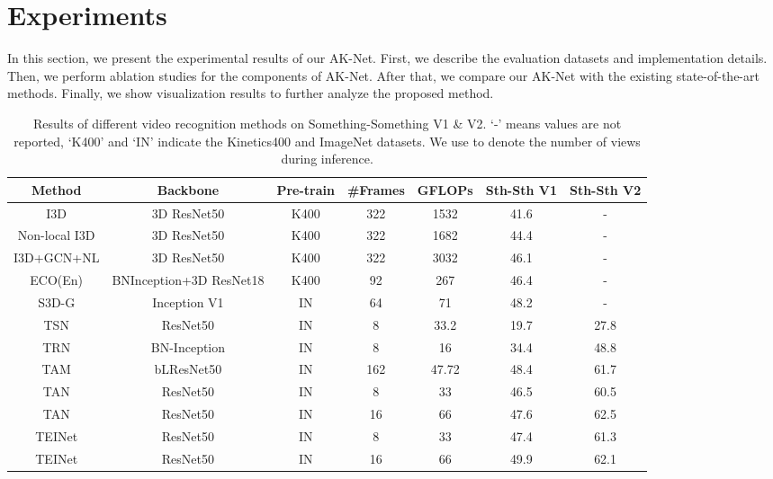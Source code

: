 \documentclass[journal]{IEEEtran}
\begin{document}
\section{Experiments} \label{sec:experiment}
In this section, we present the experimental results of our AK-Net.
First, we describe the evaluation datasets and implementation details.
Then, we perform ablation studies for the components of AK-Net.
After that, we compare our AK-Net with the existing state-of-the-art methods.
Finally, we show visualization results to further analyze the proposed method.

\begin{table*}[ht]
	\centering
	\caption{Results of different video recognition methods on Something-Something V1 \& V2. 
	`-' means values are not reported, `K400' and `IN' indicate the Kinetics400 and ImageNet datasets.
	We use  to denote the number of views during inference.}
	\label{tab:sth-sth}
	\begin{tabular}{c|c|c|c|c|c|c} \hline
		\textbf{Method} & \textbf{Backbone} & \textbf{Pre-train} & \textbf{\#Frames} & \textbf{GFLOPs} & \textbf{Sth-Sth V1} & \textbf{Sth-Sth V2} \\ \hline
		I3D \cite{carreira2017quo} & 3D ResNet50 & K400 & 322 & 1532 & 41.6 & - \\
		Non-local I3D \cite{wang2018videos} & 3D ResNet50 & K400 & 322 & 1682 & 44.4 & -\\
		I3D+GCN+NL \cite{wang2018videos} & 3D ResNet50 & K400 & 322 & 3032 & 46.1 & - \\
		ECO(En) \cite{zolfaghari2018eco} & BNInception+3D ResNet18 & K400 & 92 & 267 & 46.4 & - \\ 
		S3D-G \cite{xie2018rethinking} & Inception V1 & IN & 64 & 71 & 48.2 & - \\ \hline
		TSN \cite{wang2016temporal} & ResNet50 & IN & 8 & 33.2 & 19.7 & 27.8 \\
		TRN \cite{zhou2018temporal} & BN-Inception & IN & 8 & 16 & 34.4 & 48.8 \\
		TAM \cite{fan2019more} & bLResNet50 & IN & 162 & 47.72 & 48.4 & 61.7 \\
		TAN \cite{liu2021tam} & ResNet50 & IN & 8 & 33 & 46.5 & 60.5 \\
		TAN \cite{liu2021tam} & ResNet50 & IN & 16 & 66 & 47.6 & 62.5 \\
		TEINet \cite{liu2020teinet} & ResNet50 & IN & 8 & 33 & 47.4 & 61.3 \\
		TEINet \cite{liu2020teinet} & ResNet50 & IN & 16 & 66 & 49.9 & 62.1 \\

\end{tabular}
\end{table*}
\end{document}
